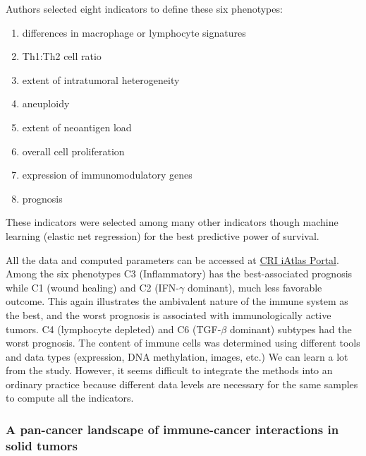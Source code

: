 \documentclass[12pt,]{book}
\providecommand{\tightlist}{%
  \setlength{\itemsep}{0pt}\setlength{\parskip}{0pt}}
\theoremstyle{definition}
\theoremstyle{definition}
\theoremstyle{definition}
\theoremstyle{remark}
\begin{document}
Authors selected eight indicators to define these six phenotypes:

\begin{enumerate}
\def\labelenumi{\arabic{enumi}.}
\tightlist
\item
  differences in macrophage or lymphocyte signatures
\item
  Th1:Th2 cell ratio
\item
  extent of intratumoral heterogeneity
\item
  aneuploidy
\item
  extent of neoantigen load
\item
  overall cell proliferation
\item
  expression of immunomodulatory genes
\item
  prognosis
\end{enumerate}

These indicators were selected among many other indicators though
machine learning (elastic net regression) for the best predictive power
of survival.

All the data and computed parameters can be accessed at
\href{https://isb-cgc.shinyapps.io/shiny-iatlas/}{CRI iAtlas Portal}.
Among the six phenotypes C3 (Inflammatory) has the best-associated
prognosis while C1 (wound healing) and C2 (IFN-\(\gamma\) dominant),
much less favorable outcome. This again illustrates the ambivalent
nature of the immune system as the best, and the worst prognosis is
associated with immunologically active tumors. C4 (lymphocyte depleted)
and C6 (TGF-\(\beta\) dominant) subtypes had the worst prognosis. The
content of immune cells was determined using different tools and data
types (expression, DNA methylation, images, etc.) We can learn a lot
from the study. However, it seems difficult to integrate the methods
into an ordinary practice because different data levels are necessary
for the same samples to compute all the indicators.

\hypertarget{a-pan-cancer-landscape-of-immune-cancer-interactions-in-solid-tumors}{%
\subsubsection{A pan-cancer landscape of immune-cancer interactions in
solid
tumors}\label{a-pan-cancer-landscape-of-immune-cancer-interactions-in-solid-tumors}}
\end{document}
